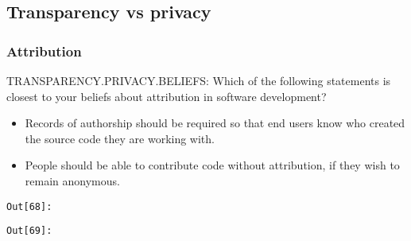 \documentclass[11pt]{article}
\providecommand{\tightlist}{%
      \setlength{\itemsep}{0pt}\setlength{\parskip}{0pt}}
\begin{document}
    \subsection{Transparency vs privacy}\label{transparency-vs-privacy}

    \subsubsection{Attribution}\label{attribution}

TRANSPARENCY.PRIVACY.BELIEFS: Which of the following statements is
closest to your beliefs about attribution in software development?

\begin{itemize}
\tightlist
\item
  Records of authorship should be required so that end users know who
  created the source code they are working with.
\item
  People should be able to contribute code without attribution, if they
  wish to remain anonymous.
\end{itemize}

\texttt{\color{outcolor}Out[{\color{outcolor}68}]:}
    

    

\texttt{\color{outcolor}Out[{\color{outcolor}69}]:}
    

    


    \begin{center}
    \end{center}
    { \hspace*{\fill} \\}
    
\end{document}
